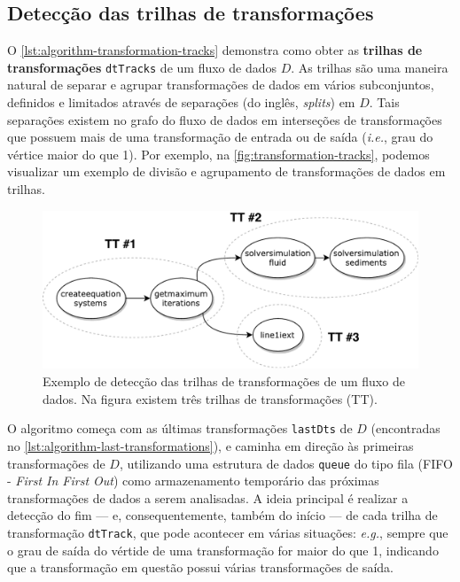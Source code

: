 \subsection{Detecção das trilhas de transformações}%
\label{subsec:deteccao-das-trilhas-de-transformacoes}

O \autoref{lst:algorithm-transformation-tracks} demonstra como obter as \textbf{trilhas de transformações} \texttt{dtTracks} de um fluxo de dados \( D \). As trilhas são uma maneira natural de separar e agrupar transformações de dados em vários subconjuntos, definidos e limitados através de separações (do inglês, \textit{splits}) em \( D \). Tais separações existem no grafo do fluxo de dados em interseções de transformações que possuem mais de uma transformação de entrada ou de saída (\textit{i.e.}, grau do vértice maior do que 1). Por exemplo, na \autoref{fig:transformation-tracks}, podemos visualizar um exemplo de divisão e agrupamento de transformações de dados em trilhas.

\begin{figure}[htb]
    \centering
    \includegraphics[width=\textwidth]{img/transformation-tracks}
    \caption[Exemplo de detecção das trilhas de transformações.]{Exemplo de detecção das trilhas de transformações de um fluxo de dados. Na figura existem três trilhas de transformações (\textsc{TT}).}%
    \label{fig:transformation-tracks}
\end{figure}

O algoritmo começa com as últimas transformações \texttt{lastDts} de \( D \) (encontradas no \autoref{lst:algorithm-last-transformations}), e caminha em direção às primeiras transformações de \( D \), utilizando uma estrutura de dados \texttt{queue} do tipo fila (FIFO - \textit{First In First Out}) como armazenamento temporário das próximas transformações de dados a serem analisadas. A ideia principal é realizar a detecção do fim --- e, consequentemente, também do início --- de cada trilha de transformação \texttt{dtTrack}, que pode acontecer em várias situações: \textit{e.g.}, sempre que o grau de saída do vértide de uma transformação for maior do que 1, indicando que a transformação em questão possui várias transformações de saída.

